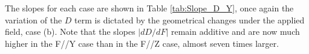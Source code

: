 \documentclass[12pt]{report}
\numberwithin{equation}{section}
\begin{document}

The slopes for each case are shown in Table \ref{tab:Slope_D_Y}, once again the variation of the $D$ term is dictated by the geometrical changes under the applied field, case (b).
Note that the slopes $|dD/dF|$ remain additive and are now much higher in the F//Y case than in the F//Z case, almost seven times larger.
\begin{table}[!ht]
    \centering
    \caption{Slopes of the straight lines in cases (a), (b) and (c) for the D and E parameter for F//Y}
    \label{tab:Slope_D_Y}
\end{table}
\end{document}
